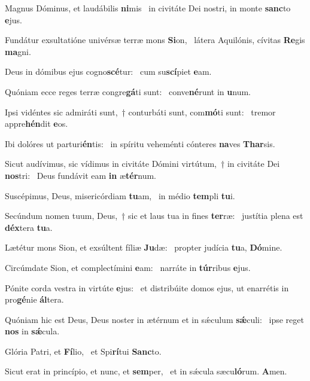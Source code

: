 \item Magnus Dóminus, et laudábilis \textbf{ni}mis~\psstar{} in civitáte Dei nostri, in monte \textbf{sanc}to \textbf{e}jus.
\item Fundátur exsultatióne univérsæ terræ mons \textbf{Si}on,~\psstar{} látera Aquilónis, cívitas \textbf{Re}gis \textbf{ma}gni.
\item Deus in dómibus ejus cogno\textbf{scé}tur:~\psstar{} cum su\textbf{scí}piet \textbf{e}am.
\item Quóniam ecce reges terræ congre\textbf{gá}ti sunt:~\psstar{} conve\textbf{né}runt in \textbf{u}num.
\item Ipsi vidéntes sic admiráti sunt,~† conturbáti sunt, com\textbf{mó}ti sunt:~\psstar{} tremor appre\textbf{hén}dit \textbf{e}os.
\item Ibi dolóres ut parturi\textbf{én}tis:~\psstar{} in spíritu veheménti cónteres \textbf{na}ves \textbf{Thar}sis.
\item Sicut audívimus, sic vídimus in civitáte Dómini virtútum,~† in civitáte Dei \textbf{nos}tri:~\psstar{} Deus fundávit eam \textbf{in} æ\textbf{tér}num.
\item Suscépimus, Deus, misericórdiam \textbf{tu}am,~\psstar{} in médio \textbf{tem}pli \textbf{tu}i.
\item Secúndum nomen tuum, Deus,~† sic et laus tua in fines \textbf{ter}ræ:~\psstar{} justítia plena est \textbf{déx}tera \textbf{tu}a.
\item Lætétur mons Sion, et exsúltent fíliæ \textbf{Ju}dæ:~\psstar{} propter judícia \textbf{tu}a, \textbf{Dó}mine.
\item Circúmdate Sion, et complectímini \textbf{e}am:~\psstar{} narráte in \textbf{túr}ribus \textbf{e}jus.
\item Pónite corda vestra in virtúte \textbf{e}jus:~\psstar{} et distribúite domos ejus, ut enarrétis in pro\textbf{gé}nie \textbf{ál}tera.
\item Quóniam hic est Deus, Deus noster in ætérnum et in sǽculum \textbf{sǽ}culi:~\psstar{} ipse reget \textbf{nos} in \textbf{sǽ}cula.
\item Glória Patri, et \textbf{Fí}lio,~\psstar{} et Spi\textbf{rí}tui \textbf{Sanc}to.
\item Sicut erat in princípio, et nunc, et \textbf{sem}per,~\psstar{} et in sǽcula sæcu\textbf{ló}rum. \textbf{A}men.
